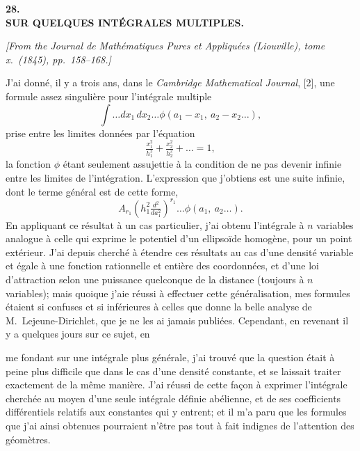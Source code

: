 \documentclass[12pt,a4paper]{article}
\begin{document}
\newpage
\setcounter{page}{195}

\begin{center}
\textbf{\Large 28.}\\[1em]
\textbf{\Large SUR QUELQUES INT\'EGRALES MULTIPLES.}
\end{center}

\textit{[From the Journal de Math\'ematiques Pures et Appliqu\'ees (Liouville), tome x.~(1845), pp.~158--168.]}

\bigskip

J'ai donn\'e, il y a trois ans, dans le \textit{Cambridge Mathematical Journal}, [2], une formule assez singuli\`ere pour l'int\'egrale multiple
\[
\int\ldots dx_1\, dx_2 \ldots \phi(a_1 - x_1,\ a_2 - x_2 \ldots),
\]
prise entre les limites donn\'ees par l'\'equation
\[
\tfrac{x_1^2}{h_1^2} + \tfrac{x_2^2}{h_2^2} + \ldots = 1,
\]
la fonction $\phi$ \'etant seulement assujettie \`a la condition de ne pas devenir infinie entre les limites de l'int\'egration. L'expression que j'obtiens est une suite infinie, dont le terme g\'en\'eral est de cette forme,
\[
A_{r_1}\left(h_1^2\tfrac{d^2}{da_1^2}\right)^{r_1}\ldots \phi(a_1,\ a_2\ldots).
\]
En appliquant ce r\'esultat \`a un cas particulier, j'ai obtenu l'int\'egrale \`a $n$ variables analogue \`a celle qui exprime le potentiel d'un ellipso\"ide homog\`ene, pour un point ext\'erieur. J'ai depuis cherch\'e \`a \'etendre ces r\'esultats au cas d'une densit\'e variable et \'egale \`a une fonction rationnelle et enti\`ere des coordonn\'ees, et d'une loi d'attraction selon une puissance quelconque de la distance (toujours \`a $n$ variables); mais quoique j'aie r\'eussi \`a effectuer cette g\'en\'eralisation, mes formules \'etaient si confuses et si inf\'erieures \`a celles que donne la belle analyse de M.~Lejeune-Dirichlet, que je ne les ai jamais publi\'ees. Cependant, en revenant il y a quelques jours sur ce sujet, en

\newpage
\setcounter{page}{196}

me fondant sur une int\'egrale plus g\'en\'erale, j'ai trouv\'e que la question \'etait \`a peine plus difficile que dans le cas d'une densit\'e constante, et se laissait traiter exactement de la m\^eme mani\`ere. J'ai r\'eussi de cette fa\c con \`a exprimer l'int\'egrale cherch\'ee au moyen d'une seule int\'egrale d\'efinie ab\'elienne, et de ses coefficients diff\'erentiels relatifs aux constantes qui y entrent; et il m'a paru que les formules que j'ai ainsi obtenues pourraient n'\^etre pas tout \`a fait indignes de l'attention des g\'eom\`etres.
\end{document}
